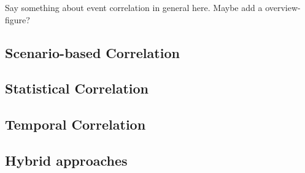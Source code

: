 Say something about event correlation in general here. Maybe add a overview-figure?

\subsection{Scenario-based Correlation}

\subsection{Statistical Correlation}
\subsection{Temporal Correlation}
\subsection{Hybrid approaches}

